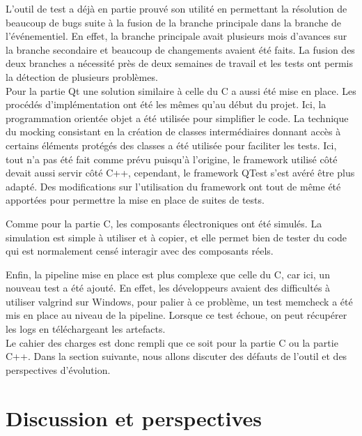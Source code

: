 \documentclass[a4paper]{article}
\begin{document}
L'outil de test a déjà en partie prouvé son utilité en permettant la résolution
de beaucoup de bugs suite à la fusion de la branche principale dans la branche
de l'événementiel. En effet, la branche principale avait plusieurs mois d'avances sur
la branche secondaire et beaucoup de changements avaient été faits. La fusion des
deux branches a nécessité près de deux semaines de travail et les tests ont
permis la détection de plusieurs problèmes.\\

Pour la partie Qt une solution similaire à celle du C a aussi été mise en place.
Les procédés d'implémentation ont été les mêmes qu'au début du projet. Ici, la
programmation orientée objet a été utilisée pour simplifier le code. La
technique du mocking consistant en la création de classes intermédiaires donnant
accès à certains éléments protégés des classes a été utilisée pour faciliter les
tests. Ici, tout n'a pas été fait comme prévu puisqu'à l'origine, le framework
utilisé côté devait aussi servir côté C++, cependant, le framework QTest s'est
avéré être plus adapté. Des modifications sur l'utilisation du framework ont
tout de même été apportées pour permettre la mise en place de suites de tests.

Comme pour la partie C, les composants électroniques ont été simulés. La
simulation est simple à utiliser et à copier, et elle permet bien de tester du
code qui est normalement censé interagir avec des composants réels.

Enfin, la pipeline mise en place est plus complexe que celle du C, car ici, un
nouveau test a été ajouté. En effet, les développeurs avaient des difficultés à
utiliser valgrind sur Windows, pour palier à ce problème, un test memcheck a été
mis en place au niveau de la pipeline. Lorsque ce test échoue, on peut récupérer
les logs en téléchargeant les artefacts.\\

Le cahier des charges est donc rempli que ce soit pour la partie C ou la partie
C++. Dans la section suivante, nous allons discuter des défauts de l'outil et des
perspectives d'évolution.

\clearpage
\section{Discussion et perspectives}%
\end{document}
